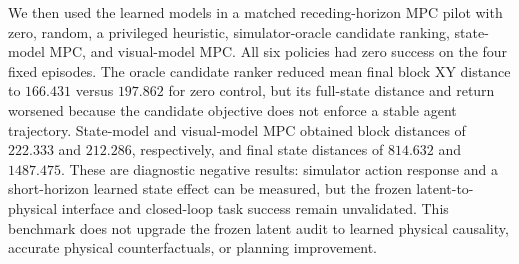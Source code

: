 \documentclass{article}
\begin{document}
\begin{table}[H]
\centering
\scriptsize
\setlength{\tabcolsep}{3pt}
\caption{Held-out physical counterfactual closure with contact-covered
training. Each entry is a mean block-XY endpoint error over 16 held-out
cases. The state arm uses the true initial physical state; the visual arm
initializes the same residual transition model from a frozen LeWM embedding.
The constant arm repeats the initial state.}
\label{tab:supp-learned-physical-closure}
\end{table}

We then used the learned models in a matched receding-horizon MPC pilot with
zero, random, a privileged heuristic, simulator-oracle candidate ranking,
state-model MPC, and visual-model MPC. All six policies had zero success on
the four fixed episodes. The oracle candidate ranker reduced mean final block
XY distance to $166.431$ versus $197.862$ for zero control, but its full-state
distance and return worsened because the candidate objective does not enforce
a stable agent trajectory. State-model and visual-model MPC obtained block
distances of $222.333$ and $212.286$, respectively, and final state distances
of $814.632$ and $1487.475$. These are diagnostic negative results: simulator
action response and a short-horizon learned state effect can be measured, but
the frozen latent-to-physical interface and closed-loop task success remain
unvalidated. This benchmark does not upgrade the frozen latent audit to
learned physical causality, accurate physical counterfactuals, or planning
improvement.
\end{document}
